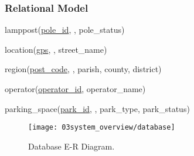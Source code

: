 \subsubsection{Relational Model}

lamppost(\uline{pole\_id}, , pole\_status)

location(\uline{gps}, , street\_name)

region(\uline{post\_code}, , parish, county, district)

operator(\uline{operator\_id}, operator\_name)

parking\_space(\uline{park\_id}, , park\_type, park\_status)

\begin{figure}[ht]
        \centering
        \texttt{[image: 03system\_overview/database]}
        \caption{Database E-R Diagram.}
        \label{fig:Database}
\end{figure}

